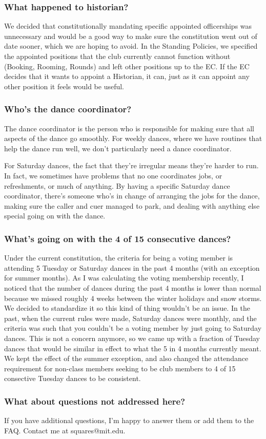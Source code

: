 \documentclass{article}
\begin{document}
\subsubsection*{What happened to historian?}
We decided that constitutionally mandating specific appointed officerships was unnecessary and would be a good way to make sure the constitution went out of date sooner, which we are hoping to avoid. In the Standing Policies, we specified the appointed positions that the club currently cannot function without (Booking, Rooming, Rounds) and left other positions up to the EC. If the EC decides that it wants to appoint a Historian, it can, just as it can appoint any other position it feels would be useful.

\subsubsection*{Who's the dance coordinator?}
The dance coordinator is the person who is responsible for making sure that all aspects of the dance go smoothly. For weekly dances, where we have routines that help the dance run well, we don't particularly need a dance coordinator.

For Saturday dances, the fact that they're irregular means they're harder to run. In fact, we sometimes have problems that no one coordinates jobs, or refreshments, or much of anything. By having a specific Saturday dance coordinator, there's someone who's in change of arranging the jobs for the dance, making sure the caller and cuer managed to park, and dealing with anything else special going on with the dance.

\subsubsection*{What's going on with the 4 of 15 consecutive dances?}
Under the current constitution, the criteria for being a voting member is attending 5 Tuesday or Saturday dances in the past 4 months (with an exception for summer months). As I was calculating the voting membership recently, I noticed that the number of dances during the past 4 months is lower than normal because we missed roughly 4 weeks between the winter holidays and snow storms. We decided to standardize it so this kind of thing wouldn't be an issue. In the past, when the current rules were made, Saturday dances were monthly, and the criteria was such that you couldn't be a voting member by just going to Saturday dances. This is not a concern anymore, so we came up with a fraction of Tuesday dances that would be similar in effect to what the 5 in 4 months currently meant. We kept the effect of the summer exception, and also changed the attendance requirement for non-class members seeking to be club members to 4 of 15 consective Tuesday dances to be consistent.

\subsubsection*{What about questions not addressed here?}
If you have additional questions, I'm happy to answer them or add them to the FAQ. Contact me at squares@mit.edu.
\end{document}
